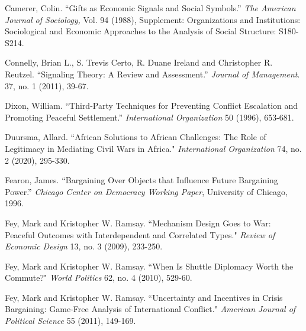 \documentclass[12pt, letterpaper]{article}
\begin{document}
{\begin{list}{}{\setlength{\leftmargin}{0.0in}\setlength{\rightmargin}{0.0in}\setlength{\itemindent}{0.0in}\setlength{\itemsep}{0.05in}}
\item Camerer, Colin. ``Gifts as Economic Signals and Social Symbols.'' \emph {The American Journal of Sociology,} Vol. 94 (1988), Supplement: Organizations and Institutions: Sociological and Economic Approaches to the Analysis of Social Structure: S180-S214. 


\item Connelly, Brian L., S. Trevis Certo, R. Duane Ireland and Christopher R. Reutzel. ``Signaling Theory: A Review and Assessment.'' \emph {Journal of Management}. 37, no. 1 (2011), 39-67.


\item Dixon, William. ``Third-Party Techniques for Preventing Conflict Escalation and Promoting Peaceful Settlement.'' \emph{International Organization} 50 (1996), 653-681. 

\item Duursma, Allard. ``African Solutions to African Challenges: The Role of Legitimacy in Mediating Civil Wars in Africa." \emph{International Organization} 74, no. 2 (2020), 295-330.

\item Fearon, James. ``Bargaining Over Objects that Influence Future Bargaining Power.'' \emph{Chicago Center on Democracy Working Paper}, University of Chicago, 1996.

\item Fey, Mark and Kristopher W. Ramsay. ``Mechanism Design Goes to War: Peaceful Outcomes with Interdependent and Correlated Types." \emph{Review of Economic Design} 13, no. 3 (2009), 233-250.

\item Fey, Mark and Kristopher W. Ramsay. ``When Is Shuttle Diplomacy Worth the Commute?" \emph{World Politics} 62, no. 4 (2010), 529-60.

\item Fey, Mark and Kristopher W. Ramsay. ``Uncertainty and Incentives in Crisis Bargaining: Game-Free Analysis of International Conflict." \emph{American Journal of Political Science} 55 (2011), 149-169. 


\end{list}}
\end{document}
